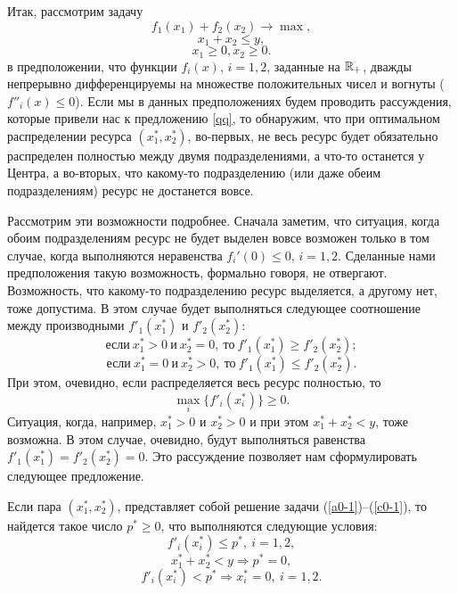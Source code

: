    Итак, рассмотрим задачу
\begin{equation}
\label{a0-1} f_{1}(x_{1})+f_{2}(x_{2})\rightarrow\max,
\end{equation}
\begin{equation}
\label{b0-1}
 x_{1}+x_{2}\leqslant y,
\end{equation}
\begin{equation}
\label{c0-1}
 x_{1}\geqslant0, x_{2}\geqslant0.
\end{equation}
    в предположении,
   что функции $f_{i}(x)$, $i=1,2$, заданные на $\mathbb{R}_{+}$, дважды
   непрерывно дифференцируемы на множестве положительных чисел и вогнуты
   ($f''_{i}(x)\leqslant0$). Если мы в данных предположениях будем проводить
   рассуждения, которые привели нас к предложению \ref{qq}, то
   обнаружим, что при оптимальном распределении ресурса $(x_{1}^{*},x_{2}^{*})$,
   во-первых, не весь ресурс будет обязательно распределен
   полностью между двумя подразделениями, а что-то останется у Центра, а во-вторых,
   что какому-то подразделению (или даже обеим подразделениям) ресурс не достанется вовсе.

   Рассмотрим эти возможности подробнее. Сначала заметим, что
   ситуация, когда обоим подразделениям ресурс не будет выделен
   вовсе возможен только в том случае, когда выполняются неравенства
   $f_{i}'(0)\leqslant0$, $i=1,2$. Сделанные нами
   предположения такую возможность, формально говоря, не отвергают.
   Возможность, что какому-то подразделению ресурс выделяется, а
   другому нет, тоже допустима. В этом случае будет выполняться следующее
   соотношение между производными $f'_{1}(x_{1}^{*})$ и $f'_{2}(x_{2}^{*})$:
   \[\text{если} \ x_{1}^{*}>0\ \text{и}\  x_{2}^{*}=0,\ \text{то}\ f'_{1}(x_{1}^{*})\geqslant f'_{2}(x_{2}^{*});\]
   \[\text{если} \ x_{1}^{*}=0\ \text{и}\  x_{2}^{*}>0,\ \text{то}\ f'_{1}(x_{1}^{*})\leqslant f'_{2}(x_{2}^{*}).\]
   При этом, очевидно, если распределяется весь ресурс полностью, то
   \[\max_{i}\{f'_{i}(x_{i}^{*})\}\geqslant0.\] Ситуация, когда,
   например, $x_{1}^{*}>0$ и $x_{2}^{*}>0$ и при этом
   $x_{1}^{*}+x_{2}^{*}<y$, тоже возможна. В этом случае, очевидно,
   будут выполняться равенства
   $f'_{1}(x_{1}^{*})=f'_{2}(x_{2}^{*})=0$.
   Это рассуждение позволяет нам сформулировать следующее
   предложение.

   \begin{prop}
   \label{qq-1}
    Если пара  $(x_{1}^{*},x_{2}^{*})$, представляет собой решение задачи
    (\ref{a0-1})--(\ref{c0-1}), то найдется
    такое число $p^{*}\geqslant0$, что выполняются следующие
    условия:
    \[f'_{i}(x_{i}^{*})\leqslant p^{*},\ i=1,2,\]
    \[x_{1}^{*}+x_{2}^{*}<y \Rightarrow  p^{*}=0,\]
    \[f'_{i}(x_{i}^{*})<p^{*}\Rightarrow  x_{i}^{*}=0,\ i=1,2.\]
    \end{prop}

